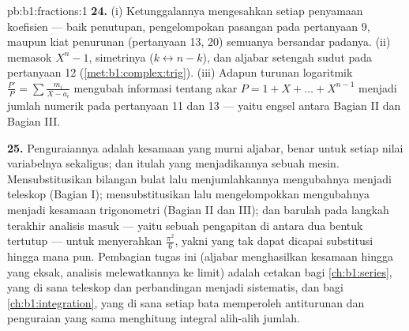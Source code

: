 \begin{solution}{pb:b1:fractions:1}
\textbf{24.} (i) Ketunggalannya mengesahkan setiap penyamaan
koefisien --- baik penutupan, pengelompokan pasangan  pada
pertanyaan 9, maupun kiat penurunan (pertanyaan 13, 20)
semuanya bersandar padanya. (ii)  memasok  $X^n -
1$, simetrinya ($k \leftrightarrow n-k$), dan
aljabar setengah sudut pada pertanyaan 12
(\cref{met:b1:complex:trig}). (iii) Adapun turunan logaritmik
$\frac{P'}P = \sum\frac{m_i}{X-a_i}$ mengubah informasi tentang
akar $P = 1 + X + \dots + X^{n-1}$ menjadi jumlah numerik
pada pertanyaan 11 dan 13 --- yaitu engsel antara Bagian II dan
Bagian III.

\textbf{25.} Penguraiannya adalah kesamaan yang murni aljabar,
benar untuk setiap nilai variabelnya sekaligus; dan itulah yang menjadikannya
sebuah mesin. Mensubstitusikan bilangan bulat lalu menjumlahkannya mengubahnya menjadi
teleskop (Bagian I); mensubstitusikan  lalu mengelompokkan
 mengubahnya menjadi kesamaan trigonometri (Bagian II dan
III); dan barulah pada langkah terakhir analisis masuk --- yaitu sebuah
pengapitan di antara dua bentuk tertutup --- untuk menyerahkan $\frac{\pi^2}6$,
yakni  yang tak dapat dicapai substitusi hingga mana pun. Pembagian
tugas ini (aljabar menghasilkan kesamaan hingga yang eksak, analisis melewatkannya
ke limit) adalah cetakan bagi \cref{ch:b1:series}, yang di sana
teleskop dan perbandingan menjadi sistematis, dan bagi
\cref{ch:b1:integration}, yang di sana setiap bata memperoleh antiturunan
dan penguraian yang sama menghitung integral alih-alih jumlah.

\end{solution}
